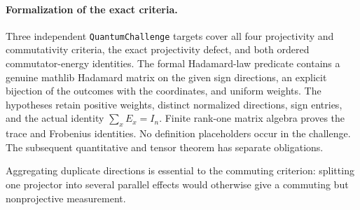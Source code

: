 \paragraph{Formalization of the exact criteria.}
Three independent \texttt{QuantumChallenge} targets cover all four
projectivity and commutativity criteria, the exact projectivity defect,
and both ordered commutator-energy identities. The formal Hadamard-law
predicate contains a genuine mathlib Hadamard matrix on the given sign
directions, an explicit bijection of the outcomes with the coordinates,
and uniform weights. The hypotheses retain positive weights, distinct
normalized directions, sign entries, and the actual identity
$\sum_xE_x=I_n$. Finite rank-one matrix algebra proves the trace and
Frobenius identities. No definition placeholders occur in the challenge.
The subsequent quantitative and tensor theorem has separate obligations.

Aggregating duplicate directions is essential to the commuting
criterion: splitting one projector into several parallel effects
would otherwise give a commuting but nonprojective measurement.

